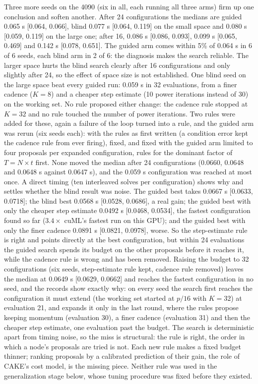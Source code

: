 Three more seeds on the 4090 (six in all, each running all three arms) firm up
one conclusion and soften another. After 24 configurations the medians are
guided 0.065 s [0.064, 0.066], blind 0.077 s [0.064, 0.119] on the small space and
0.080 s [0.059, 0.119] on the large one; after 16, 0.086 s [0.086, 0.093], 0.099 s
[0.065, 0.469] and 0.142 s [0.078, 0.651]. The guided arm comes within 5\% of
0.064 s in 6 of 6 seeds, each blind arm in 2 of 6: the diagnosis makes the search
reliable. The larger space hurts the blind search clearly after 16
configurations and only slightly after 24, so the effect of space size is not
established. One blind seed on the large space beat every guided run: 0.059 s in
32 evaluations, from a finer cadence ($K=8$) and a cheaper step estimate (10 power
iterations instead of 30) on the working set. No rule proposed either change: the
cadence rule stopped at $K=32$ and no rule touched the number of power
iterations. Two rules were added for these, again a failure of the loop turned
into a rule, and the guided arm was rerun (six seeds each): with the rules as
first written (a condition error kept the cadence rule from ever firing), fixed,
and fixed with the guided arm limited to four proposals per expanded
configuration, rules for the dominant factor of $T=N\times t$ first. None moved the
median after 24 configurations (0.0660, 0.0648 and 0.0648 s against 0.0647 s), and
the 0.059 s configuration was reached at most once. A direct timing (ten
interleaved solves per configuration) shows why and settles whether the blind
result was noise. The guided best takes 0.0667 s [0.0633, 0.0718]; the blind best
0.0568 s [0.0528, 0.0686], a real gain; the guided best with only the cheaper step
estimate 0.0492 s [0.0468, 0.0534], the fastest configuration found so far
($3.4\times$ cuML's fastest run on this GPU); and the guided best with only the finer
cadence 0.0891 s [0.0821, 0.0978], worse. So the step-estimate rule is right and
points directly at the best configuration, but within 24 evaluations the guided
search spends its budget on the other proposals before it reaches it, while the
cadence rule is wrong and has been removed. Raising the budget to 32 configurations (six seeds,
step-estimate rule kept, cadence rule removed) leaves the median at 0.0649 s
[0.0629, 0.0662] and reaches the fastest configuration in no seed, and the records
show exactly why: on every seed the search first reaches the configuration it
must extend (the working set started at $p/16$ with $K=32$) at evaluation 21, and
expands it only in the last round, where the rules propose keeping momentum
(evaluation 30), a finer cadence (evaluation 31) and then the cheaper step
estimate, one evaluation past the budget. The search is deterministic apart from
timing noise, so the miss is structural: the rule is right, the order in which a
node's proposals are tried is not. Each new rule makes a fixed budget
thinner; ranking proposals by a calibrated prediction of their gain, the role of
CAKE's cost model, is the missing piece. Neither rule was used in the
generalization stage below, whose tuning procedure was fixed before they existed.

